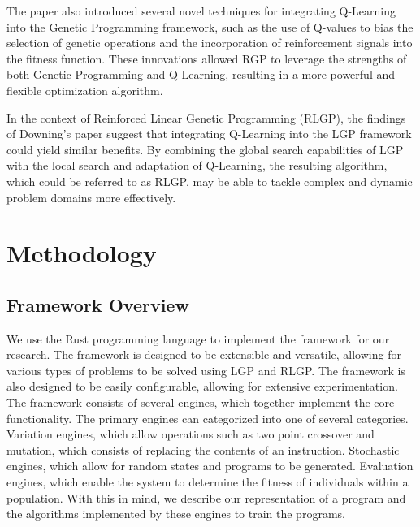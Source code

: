\documentclass[12pt, final]{dalcsthesis}
\begin{document}
The paper also introduced several novel techniques for integrating Q-Learning into the Genetic Programming framework, such as the use of Q-values to bias the selection of genetic operations and the incorporation of reinforcement signals into the fitness function. These innovations allowed RGP to leverage the strengths of both Genetic Programming and Q-Learning, resulting in a more powerful and flexible optimization algorithm.

In the context of Reinforced Linear Genetic Programming (RLGP), the findings of Downing's paper suggest that integrating Q-Learning into the LGP framework could yield similar benefits. By combining the global search capabilities of LGP with the local search and adaptation of Q-Learning, the resulting algorithm, which could be referred to as RLGP, may be able to tackle complex and dynamic problem domains more effectively.

\chapter{Methodology}
\section{Framework Overview}
We use the Rust programming language to implement the framework for our research. The framework is designed to be extensible and versatile, allowing
for various types of problems to be solved using LGP and RLGP. The framework is also designed to be easily configurable, allowing for extensive experimentation. The framework consists of several engines, which together implement the core functionality. The primary engines can categorized into one of several categories. Variation engines, which allow operations such as two point crossover and mutation, which consists of replacing the contents of an instruction. Stochastic engines, which allow for random states and programs to be generated. Evaluation engines, which enable the system to determine the fitness of individuals within a population. With this in mind, we describe our representation of a program and the algorithms implemented by these engines to train the programs.
\end{document}
